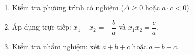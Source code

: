\begin{enumerate}
\item Kiểm tra phương trình có nghiệm ($\Delta \ge 0$ hoặc $a \cdot c < 0$).
\item Áp dụng trực tiếp: $x_1 + x_2 = -\dfrac{b}{a}$ và $x_1 x_2 = \dfrac{c}{a}$.
\item Kiểm tra nhẩm nghiệm: xét $a + b + c$ hoặc $a - b + c$.
\end{enumerate}
